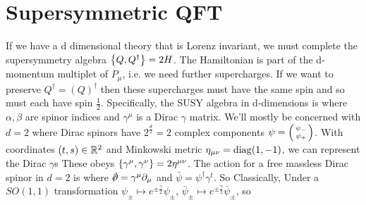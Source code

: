 \documentclass{article}
\begin{document}
\section{Supersymmetric QFT}
If we have a d dimensional theory that is Lorenz invariant, we must complete the supersymmetry algebra $\acomm[Q]{Q^\dagger} = 2H$. The Hamiltonian is part of the d-momentum multiplet of $P_\mu$, i.e. we need further supercharges. If we want to preserve $Q^\dagger = (Q)^\dagger$ then these supercharges must have the same spin and so must each have spin $\frac{1}{2}$. Specifically, the SUSY algebra in d-dimensions is 
where $\alpha,\beta$ are spinor indices and $\gamma^\mu$ is a Dirac $\gamma$ matrix. We'll mostly be concerned with $d=2$ where Dirac spinors have $2^\frac{d}{2} = 2$ complex components $\psi = \begin{psmallmatrix} \psi_- \\ \psi_+ \end{psmallmatrix}$. With coordinates $(t,s) \in \mbb{R}^2$ and Minkowski metric $\eta_{\mu\nu} = \diag(1,-1)$, we can represent the Dirac $\gamma$s 
These obeys $\acomm[\gamma^\mu]{\gamma^\nu} = 2\eta^{\mu\nu}$. The action for a free massless Dirac spinor in $d=2$ is 
where $\slashed{\del} = \gamma^\mu \del_\mu$ and $\bar{\psi} = \psi^\dagger \gamma^t$. So 
Classically, 
Under a $SO(1,1)$ transformation $\psi_\pm \mapsto e^{\pm \frac{\gamma}{2}}\psi_\pm$, $\bar{\psi}_\pm \mapsto e^{\pm \frac{\gamma}{2}}\bar{\psi}_\pm$, so 
\end{document}

